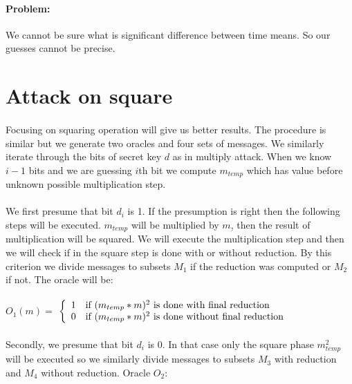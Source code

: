 \documentclass[thesis=B,english]{FITthesis}[2012/10/20]
\begin{document}
\paragraph*{Problem:}{
We cannot be sure what is significant difference between time means. So our guesses cannot be precise.}

\section{Attack on square}
\paragraph*{}{
Focusing on squaring operation will give us better results. The procedure is similar but we generate two oracles and four sets of messages. We similarly iterate
through the bits of secret key \(d\) as in multiply attack. When we know \( i - 1 \) bits and we are guessing \(i\)th bit we compute \(m_{temp}\) 
which has value before unknown possible multiplication step.\cite{Dhem}
}
\paragraph*{}{
We first presume that bit \(d_i\) is 1. If the presumption is right then the following steps will be executed. \(m_{temp}\) will be multiplied by \(m\), 
then the result of multiplication will be squared. We will execute the multiplication step and then we will check if in the square step is done with or without reduction.
By this criterion we divide messages to subsets \(M_1\) if the reduction was computed or \(M_2\) if not. The oracle will be:
}
\paragraph*{}
\( O_1(m) =\) $\left\{
  \begin{array}{cl}
    \text{1} & \text{\mbox{if}  \((m_{temp} * m)^2\) is done with final reduction} \\
    \text{0} & \text{\mbox{if}  \((m_{temp} * m)^2\) is done without final reduction} 
  \end{array}
\right.$
\paragraph*{}{
Secondly, we presume that bit \(d_i\) is 0. In that case only the square phase \(m_{temp}^2\) will be executed so we similarly divide messages to subsets \(M_3\) with reduction and 
\(M_4\) without reduction. Oracle \(O_2\):
}
\end{document}
